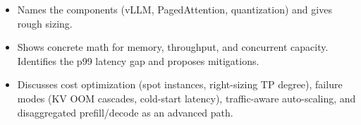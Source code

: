 \begin{interviewq}

\goodgreat
\begin{itemize}
    \item {} Names the components (vLLM, PagedAttention, quantization) and gives rough sizing.
    \item {} Shows concrete math for memory, throughput, and concurrent capacity. Identifies the p99 latency gap and proposes mitigations.
    \item {} Discusses cost optimization (spot instances, right-sizing TP degree), failure modes (KV OOM cascades, cold-start latency), traffic-aware auto-scaling, and disaggregated prefill/decode as an advanced path.
\end{itemize}

\end{interviewq}


